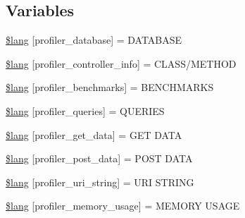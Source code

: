 \subsection*{Variables}
\begin{DoxyCompactItemize}
\item 
\hyperlink{_admin_2system_2language_2english_2profiler__lang_8php_a93beea1bc75788ad2b7d3d3895984282}{\$lang} \mbox{[}\textquotesingle{}profiler\+\_\+database\textquotesingle{}\mbox{]} = \textquotesingle{}D\+A\+T\+A\+B\+A\+S\+E\textquotesingle{}
\item 
\hyperlink{_admin_2system_2language_2english_2profiler__lang_8php_a13e794a194b3fae4ac89472fa90a39a4}{\$lang} \mbox{[}\textquotesingle{}profiler\+\_\+controller\+\_\+info\textquotesingle{}\mbox{]} = \textquotesingle{}C\+L\+A\+S\+S/M\+E\+T\+H\+O\+D\textquotesingle{}
\item 
\hyperlink{_admin_2system_2language_2english_2profiler__lang_8php_a542e9f6b34cf149d1574a8f6b2c9568d}{\$lang} \mbox{[}\textquotesingle{}profiler\+\_\+benchmarks\textquotesingle{}\mbox{]} = \textquotesingle{}B\+E\+N\+C\+H\+M\+A\+R\+K\+S\textquotesingle{}
\item 
\hyperlink{_admin_2system_2language_2english_2profiler__lang_8php_ac8efd051248fb102a6cc0c9b418ffd6d}{\$lang} \mbox{[}\textquotesingle{}profiler\+\_\+queries\textquotesingle{}\mbox{]} = \textquotesingle{}Q\+U\+E\+R\+I\+E\+S\textquotesingle{}
\item 
\hyperlink{_admin_2system_2language_2english_2profiler__lang_8php_aed0d74a29b2ef17977baa94091d06058}{\$lang} \mbox{[}\textquotesingle{}profiler\+\_\+get\+\_\+data\textquotesingle{}\mbox{]} = \textquotesingle{}G\+E\+T D\+A\+T\+A\textquotesingle{}
\item 
\hyperlink{_admin_2system_2language_2english_2profiler__lang_8php_a6b2928f829db3649049332dc4468018d}{\$lang} \mbox{[}\textquotesingle{}profiler\+\_\+post\+\_\+data\textquotesingle{}\mbox{]} = \textquotesingle{}P\+O\+S\+T D\+A\+T\+A\textquotesingle{}
\item 
\hyperlink{_admin_2system_2language_2english_2profiler__lang_8php_a1f1644f4e586555cb83f718552502136}{\$lang} \mbox{[}\textquotesingle{}profiler\+\_\+uri\+\_\+string\textquotesingle{}\mbox{]} = \textquotesingle{}U\+R\+I S\+T\+R\+I\+N\+G\textquotesingle{}
\item 
\hyperlink{_admin_2system_2language_2english_2profiler__lang_8php_aaffc8cc3dd25f21388a6edb5fbfc8859}{\$lang} \mbox{[}\textquotesingle{}profiler\+\_\+memory\+\_\+usage\textquotesingle{}\mbox{]} = \textquotesingle{}M\+E\+M\+O\+R\+Y U\+S\+A\+G\+E\textquotesingle{}

\end{DoxyCompactItemize}
